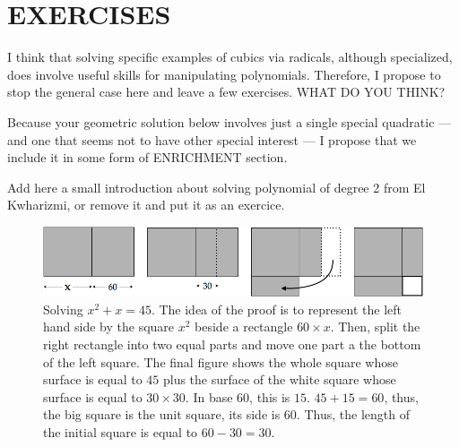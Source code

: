 
\chapter{EXERCISES}
\label{ch:Exercises}


{\Arny
I think that solving specific examples of cubics via radicals, although specialized, does
involve useful skills for manipulating polynomials.  Therefore, I
propose to stop the general case here and leave a few exercises.  WHAT DO YOU THINK?}



{\Arny Because your geometric solution below involves just a single
  special quadratic --- and one that seems not to have other special
  interest --- I propose that we include it in some form of ENRICHMENT
  section.  }

{}

{\Denis Add here a small introduction about solving polynomial of degree 2 from El Kwharizmi, or remove it and put it as an exercice.}
\begin{figure}[htb]
\begin{center}
       \includegraphics[scale=0.4]{FiguresArithmetic/tabletteMesopotamie}
\caption{Solving $x^2 + x = 45$.
The idea of the proof is to represent the left hand side by the square $x^2$ beside a rectangle $60 \times x$.
Then, split the right rectangle into two equal parts and move one part a the bottom of the left square.
The final figure shows the whole square whose surface is equal to $45$ plus the surface of the white square
whose surface is equal to $30 \times 30$.
In base $60$, this is $15$. 
$45+15 = 60$, thus, the big square is the unit square, its side is $60$.
Thus, the length of the initial square is equal to $60-30=30$.}
\label{fig:equationBabillon}
\end{center}
\end{figure}


